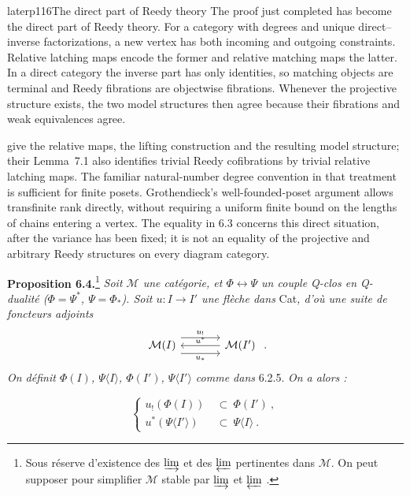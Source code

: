 \begin{dcomment}{later}{p116}{The direct part of Reedy theory}
The proof just completed has become the direct part of Reedy theory. For a category with degrees and unique direct--inverse factorizations, a new vertex has both incoming and outgoing constraints. Relative latching maps encode the former and relative matching maps the latter. In a direct category the inverse part has only identities, so matching objects are terminal and Reedy fibrations are objectwise fibrations. Whenever the projective structure exists, the two model structures then agree because their fibrations and weak equivalences agree.

\citet[Definition~4.14, Observation~4.16 and Theorem~4.18]{RiehlVerity2014Reedy} give the relative maps, the lifting construction and the resulting model structure; their Lemma~7.1 also identifies trivial Reedy cofibrations by trivial relative latching maps. The familiar natural-number degree convention in that treatment is sufficient for finite posets. Grothendieck's well-founded-poset argument allows transfinite rank directly, without requiring a uniform finite bound on the lengths of chains entering a vertex. The equality in 6.3 concerns this direct situation, after the variance has been fixed; it is not an equality of the projective and arbitrary Reedy structures on every diagram category.
\end{dcomment}


\textbf{Proposition 6.4.}\footnote[34]{Sous réserve d'existence des $\varinjlim$ et des $\varprojlim$ pertinentes dans $\mathcal{M}$. On peut supposer pour simplifier $\mathcal{M}$ stable par $\varinjlim$ et $\varprojlim$ .} %
\textit{Soit $\mathcal{M}$ une catégorie, et $\Phi \longleftrightarrow \Psi$ un couple Q-clos en Q-dualité ($\Phi = \Psi^*$, $\Psi = \Phi_*$). Soit $u : I \longrightarrow I'$ une flèche dans} Cat\textit{, d'où une suite de foncteurs adjoints}
\[
\begin{tikzcd}[column sep=large]
\mathcal{M}(I) \arrow[r, shift left=3, "u_!"] \arrow[r, shift right=3, "u_*"'] & \mathcal{M}(I') \arrow[l, "u^*"']
\end{tikzcd}\ .
\]
\textit{On définit $\Phi(I)$, $\Psi\langle I\rangle$, $\Phi(I')$, $\Psi\langle I'\rangle$ comme dans} 6.2.5. \textit{On a alors :}

\[
\left\{
\begin{aligned}
u_!(\Phi(I)) &\ \subset\ \Phi(I')\ ,\\
u^*(\Psi\langle I'\rangle) &\ \subset\ \Psi\langle I\rangle\ .
\end{aligned}
\right.
\tag*{(6.4.1)}
\]

